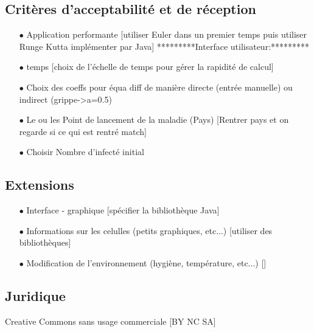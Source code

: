 \documentclass[12pt,a4paper]{report}
\begin{document}
\subsection*{Critères d'acceptabilité et de réception}
\begin{flushleft}
  \begin{itemize}
	\item[$\bullet$] Application performante [utiliser Euler dans un premier temps puis utiliser Runge Kutta implémenter par Java]
*********Interface utilisateur:*********
	\item[$\bullet$] temps [choix de l'échelle de temps pour gérer la rapidité de calcul]
	\item[$\bullet$] Choix des coeffs pour équa diff de manière directe (entrée manuelle) ou indirect (grippe->a=0.5)
	\item[$\bullet$] Le ou les Point de lancement de la maladie (Pays) [Rentrer pays et on regarde si ce qui est rentré match]
	\item[$\bullet$] Choisir Nombre d'infecté initial
  \end{itemize}
\end{flushleft}

\subsection*{Extensions}
\begin{flushleft}
  \begin{itemize}
	\item[$\bullet$] Interface - graphique [spécifier la bibliothèque Java]
	\item[$\bullet$] Informations sur les celulles (petits graphiques, etc...) [utiliser des bibliothèques]
	\item[$\bullet$] Modification de l'environnement (hygiène, température, etc...) []
  \end{itemize}
\end{flushleft}

\subsection*{Juridique}
\begin{flushleft}
Creative Commons sans usage commerciale [BY NC SA]
\end{flushleft}
\end{document}
